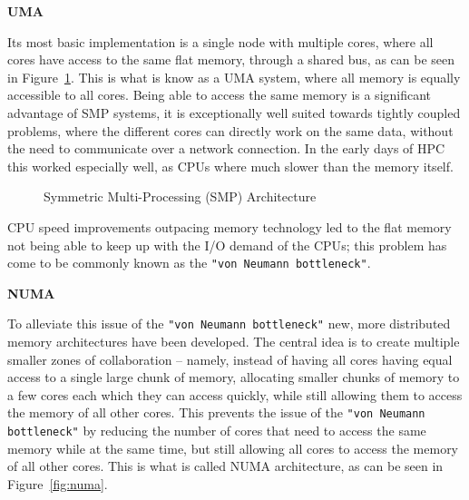 \textbf{UMA}

Its most basic implementation is a single node with multiple cores, where all cores have access to the same flat memory,
through a shared \gls{bus}, as can be seen in Figure~\ref{fig:smp}.
This is what is know as a \ac{UMA} system, where all memory is equally accessible to all cores.
Being able to access the same memory is a significant advantage of \ac{SMP} systems,
it is exceptionally well suited towards tightly coupled problems, where the different cores can directly
work on the same data, without the need to communicate over a network connection.
In the early days of \ac{HPC} this worked especially well, as \ac{CPU}s where much slower than
the memory itself.

\begin{figure}[!ht]
  \vspace{0.8cm}
  \centering
  \caption{Symmetric Multi-Processing (SMP) Architecture}
  \label{fig:smp}
\end{figure}

\ac{CPU} speed improvements outpacing memory technology led to the flat memory not being
able to keep up with the \ac{I/O} demand of the \ac{CPU}s; this problem has come to be commonly known as the \texttt{"von Neumann bottleneck"}.

\textbf{NUMA}

To alleviate this issue of the \texttt{"von Neumann bottleneck"} new, more distributed memory architectures have been developed.
The central idea is to create multiple smaller zones of collaboration  -- namely,
instead of having all cores having equal access to a single large chunk of memory,
allocating smaller chunks of memory to a few cores each which they can access quickly,
while still allowing them to access the memory of all other cores.
This prevents the issue of the \texttt{"von Neumann bottleneck"} by reducing the number of cores that need to access the same memory
while at the same time, but still allowing all cores to access the memory of all other cores.
This is what is called \ac{NUMA} architecture, as can be seen in Figure~\ref{fig:numa}.

